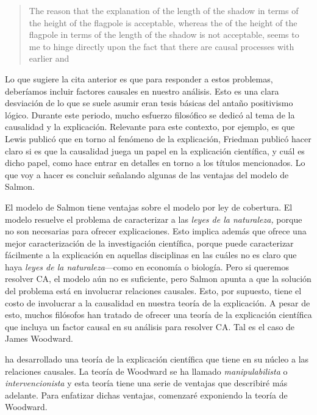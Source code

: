 	\begin{quote}
    The reason that the explanation of the length of the
    shadow in terms of the height of the flagpole is
    acceptable, whereas the  of the height
    of the flagpole in terms of the length of the shadow is
    not acceptable, seems to me to hinge directly upon the
    fact that there are causal processes with earlier and
	\end{quote}

Lo que sugiere la cita anterior es que para responder a
estos problemas, deberíamos incluir factores causales en
nuestro análisis. Esto es una clara desviación de lo que se
suele asumir eran tesis básicas del antaño positivismo
lógico. Durante este periodo, mucho esfuerzo filosófico se
dedicó al tema de la causalidad y la explicación. Relevante
para este contexto, por ejemplo, es que Lewis publicó
que en torno al fenómeno de la explicación, Friedman publicó
hacer claro si es que la causalidad juega un papel en la
explicación científica, y cuál es dicho papel, como hace
entrar en detalles en torno a los títulos mencionados. Lo
que voy a hacer es concluir señalando algunas de las
ventajas del modelo de Salmon.

El modelo de Salmon tiene ventajas sobre el modelo por ley
de cobertura. El modelo resuelve el problema de caracterizar
a las \emph{leyes de la naturaleza,} porque no son
necesarias para ofrecer explicaciones. Esto implica además
que ofrece una mejor caracterización de la investigación
científica, porque puede caracterizar fácilmente a la
explicación en aquellas disciplinas en las cuáles no es
claro que haya \emph{leyes de la naturaleza}---como en
economía o biología. Pero si queremos resolver CA, el modelo
aún no es suficiente, pero Salmon apunta a que la solución
del problema está en involucrar relaciones causales. Esto,
por supuesto, tiene el costo de involucrar a la causalidad
en nuestra teoría de la explicación. A pesar de esto, muchos
filósofos han tratado de ofrecer una teoría de la
explicación científica que incluya un factor causal en su
análisis para resolver CA. Tal es el caso de James
Woodward.

ha desarrollado una teoría de la explicación científica que
tiene en su núcleo a las relaciones causales. La
teoría de Woodward se ha llamado \emph{manipulabilista} o
\emph{intervencionista} y esta teoría tiene una serie de ventajas que describiré más
adelante. Para enfatizar dichas ventajas, comenzaré
exponiendo la teoría de Woodward.

